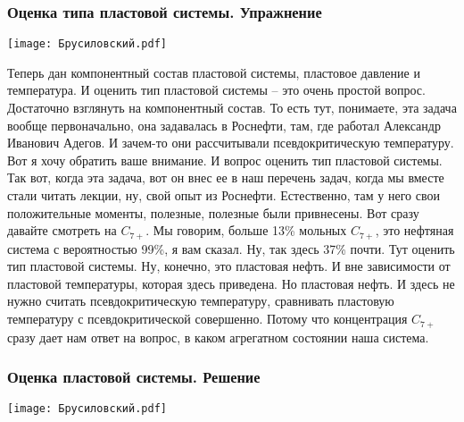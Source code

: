 \documentclass[main.tex]{subfiles}
\begin{document}
\subsubsection{Оценка типа пластовой системы. Упражнение}

\begin{center}
\texttt{[image: Брусиловский.pdf]}
\end{center}

Теперь дан компонентный состав пластовой системы, пластовое давление и температура.
И оценить тип пластовой системы -- это очень простой вопрос.
Достаточно взглянуть на компонентный состав.
То есть тут, понимаете, эта задача вообще первоначально, она задавалась в Роснефти, там, где работал Александр Иванович Адегов.
И зачем-то они рассчитывали псевдокритическую температуру.
Вот я хочу обратить ваше внимание.
И вопрос оценить тип пластовой системы.
Так вот, когда эта задача, вот он внес ее в наш перечень задач, когда мы вместе стали читать лекции, ну, свой опыт из Роснефти.
Естественно, там у него свои положительные моменты, полезные, полезные были привнесены.
Вот сразу давайте смотреть на $C_{7+}$.
Мы говорим, больше 13\% мольных $C_{7+}$, это нефтяная система с вероятностью 99\%, я вам сказал.
Ну, так здесь 37\% почти.
Тут оценить тип пластовой системы.
Ну, конечно, это пластовая нефть.
И вне зависимости от пластовой температуры, которая здесь приведена.
Но пластовая нефть.
И здесь не нужно считать псевдокритическую температуру, сравнивать пластовую температуру с псевдокритической совершенно.
Потому что концентрация $C_{7+}$ сразу дает нам ответ на вопрос, в каком агрегатном состоянии наша система.

\subsubsection{Оценка пластовой системы. Решение}

\begin{center}
\texttt{[image: Брусиловский.pdf]}
\end{center}
\end{document}
